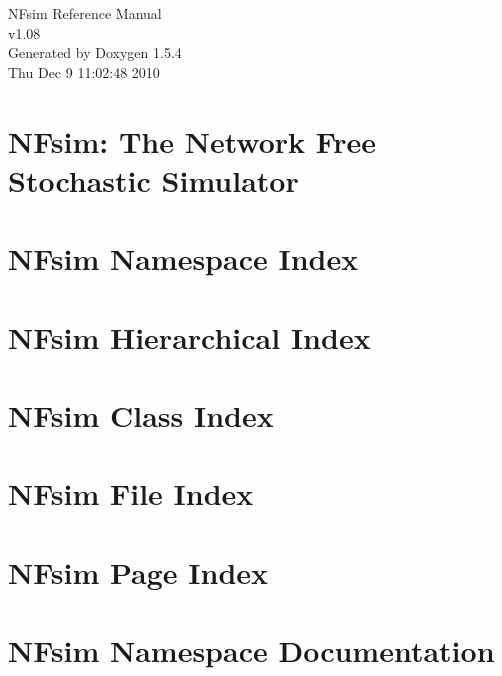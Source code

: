 \documentclass[a4paper]{book}
\begin{document}
\begin{titlepage}
\vspace*{7cm}
\begin{center}
{\Large NFsim Reference Manual\\[1ex]\large v1.08 }\\
\vspace*{1cm}
{\large Generated by Doxygen 1.5.4}\\
\vspace*{0.5cm}
{\small Thu Dec 9 11:02:48 2010}\\
\end{center}
\end{titlepage}
\clearemptydoublepage
{}
\tableofcontents
\clearemptydoublepage
{}
\chapter{NFsim: The Network Free Stochastic Simulator }
\label{index}
\chapter{NFsim Namespace Index}

\chapter{NFsim Hierarchical Index}

\chapter{NFsim Class Index}

\chapter{NFsim File Index}

\chapter{NFsim Page Index}

\chapter{NFsim Namespace Documentation}









\end{document}
